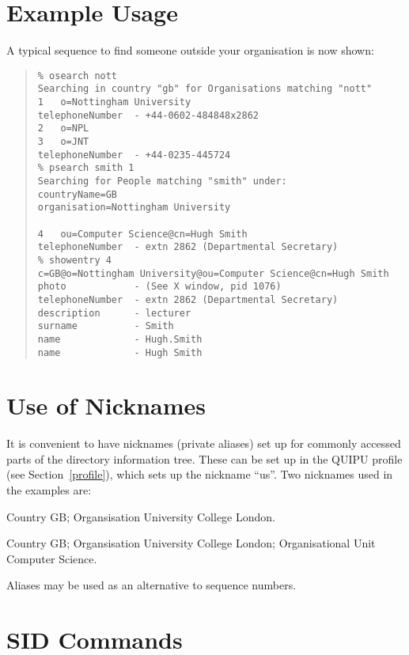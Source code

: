 \section {Example Usage}

A typical sequence to find someone outside your organisation is now shown:


\begin{quote}\small\begin{verbatim}
% osearch nott
Searching in country "gb" for Organisations matching "nott"
1   o=Nottingham University
telephoneNumber  - +44-0602-484848x2862
2   o=NPL
3   o=JNT
telephoneNumber  - +44-0235-445724
% psearch smith 1
Searching for People matching "smith" under:
countryName=GB
organisation=Nottingham University

4   ou=Computer Science@cn=Hugh Smith
telephoneNumber  - extn 2862 (Departmental Secretary)
% showentry 4
c=GB@o=Nottingham University@ou=Computer Science@cn=Hugh Smith
photo            - (See X window, pid 1076)
telephoneNumber  - extn 2862 (Departmental Secretary)
description      - lecturer
surname          - Smith
name             - Hugh.Smith
name             - Hugh Smith
\end{verbatim}\end{quote}



\section {Use of Nicknames}

It is convenient to have nicknames (private aliases) set up for commonly accessed parts of the
directory information tree.  These can be set up in the QUIPU profile (see
Section~\ref{profile}), which sets up the nickname ``us''.
Two nicknames used in the examples are:

\begin{describe}
\item[\verb+ucl+:]  Country GB; Organsisation University College London.
\item[\verb+cs+:] Country GB; Organsisation University College London;
Organisational Unit Computer Science.
\end{describe}

Aliases may be used as an alternative to sequence numbers.

\section {SID Commands}

